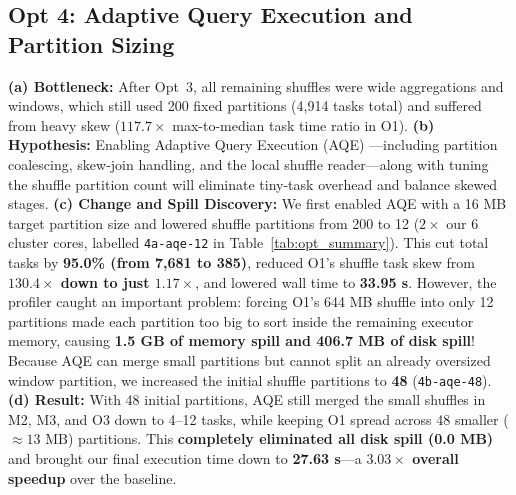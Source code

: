 \documentclass[sigconf,nonacm]{acmart}
\begin{document}
\subsection{Opt 4: Adaptive Query Execution and Partition Sizing}
\textbf{(a) Bottleneck:} After Opt~3, all remaining shuffles were wide aggregations and windows, which still used 200 fixed partitions (4,914 tasks total) and suffered from heavy skew ($117.7\times$ max-to-median task time ratio in O1).
\textbf{(b) Hypothesis:} Enabling Adaptive Query Execution (AQE) \cite{sparktuning2026}---including partition coalescing, skew-join handling, and the local shuffle reader---along with tuning the shuffle partition count will eliminate tiny-task overhead and balance skewed stages.
\textbf{(c) Change and Spill Discovery:} We first enabled AQE with a 16 MB target partition size and lowered shuffle partitions from 200 to 12 ($2 \times$ our 6 cluster cores, labelled \texttt{4a-aqe-12} in Table~\ref{tab:opt_summary}). This cut total tasks by \textbf{95.0\% (from 7,681 to 385)}, reduced O1's shuffle task skew from \textbf{$130.4\times$ down to just $1.17\times$}, and lowered wall time to \textbf{33.95 s}. However, the profiler caught an important problem: forcing O1's 644 MB shuffle into only 12 partitions made each partition too big to sort inside the remaining executor memory, causing \textbf{1.5 GB of memory spill and 406.7 MB of disk spill}! Because AQE can merge small partitions but cannot split an already oversized window partition, we increased the initial shuffle partitions to \textbf{48} (\texttt{4b-aqe-48}).
\textbf{(d) Result:} With 48 initial partitions, AQE still merged the small shuffles in M2, M3, and O3 down to 4--12 tasks, while keeping O1 spread across 48 smaller ($\approx 13\text{ MB}$) partitions. This \textbf{completely eliminated all disk spill (0.0 MB)} and brought our final execution time down to \textbf{27.63 s}---a \textbf{$3.03\times$ overall speedup} over the baseline.
\end{document}
